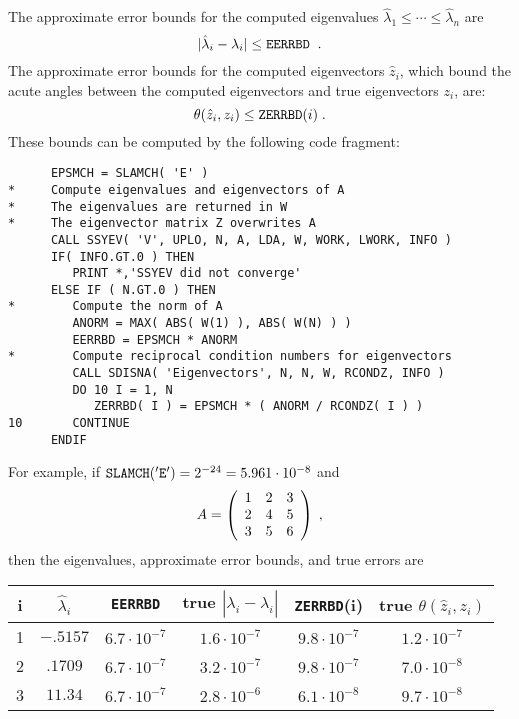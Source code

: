 The approximate error bounds
for the computed eigenvalues
$\hat{\lambda}_1 \leq \cdots \leq \hat{\lambda}_n$ are
\[
| \hat{\lambda}_i - \lambda_i | \leq {\tt EERRBD} \; \; .
\]
The approximate error bounds for the computed eigenvectors
$\hat{z}_i$, which bound the acute angles
between the computed eigenvectors and true
eigenvectors $z_i$, are:
\[
\theta ( \hat{z}_i , z_i ) \leq {\tt ZERRBD} (i) \; .
\]
These bounds can be computed by the following code fragment:

\begin{verbatim}
      EPSMCH = SLAMCH( 'E' )
*     Compute eigenvalues and eigenvectors of A
*     The eigenvalues are returned in W
*     The eigenvector matrix Z overwrites A
      CALL SSYEV( 'V', UPLO, N, A, LDA, W, WORK, LWORK, INFO )
      IF( INFO.GT.0 ) THEN
         PRINT *,'SSYEV did not converge'
      ELSE IF ( N.GT.0 ) THEN
*        Compute the norm of A
         ANORM = MAX( ABS( W(1) ), ABS( W(N) ) )
         EERRBD = EPSMCH * ANORM
*        Compute reciprocal condition numbers for eigenvectors
         CALL SDISNA( 'Eigenvectors', N, N, W, RCONDZ, INFO )
         DO 10 I = 1, N
            ZERRBD( I ) = EPSMCH * ( ANORM / RCONDZ( I ) )
10       CONTINUE
      ENDIF
\end{verbatim}

For example,
if ${\tt SLAMCH('E')} = 2^{-24} = 5.961 \cdot 10^{-8}$ and
\[
A = \bmat{ccc} 1 & 2 & 3 \\ 2 & 4 & 5 \\ 3 & 5 & 6 \emat \; ,
\]
then the eigenvalues, approximate error bounds, and true errors are

\begin{center}
\begin{tabular}{||c|c||c|c||c|c||}
\hline
i & $\hat{\lambda}_i$ & {\tt EERRBD} & true $| \hat{\lambda}_i - \lambda_i |$ &
{\tt ZERRBD}(i) & true $\theta ( \hat{z}_i , z_i )$ \\ \hline
1 & $-.5157$ & $6.7 \cdot 10^{-7}$ & $1.6 \cdot 10^{-7}$ &
$9.8 \cdot 10^{-7}$ & $1.2 \cdot 10^{-7}$ \\
2 & $.1709$  & $6.7 \cdot 10^{-7}$ & $3.2 \cdot 10^{-7}$ &
$9.8 \cdot 10^{-7}$ & $7.0 \cdot 10^{-8}$ \\
3 & $11.34$  & $6.7 \cdot 10^{-7}$ & $2.8 \cdot 10^{-6}$ &
$6.1 \cdot 10^{-8}$ & $9.7 \cdot 10^{-8}$ \\ \hline
\end{tabular}
\end{center}

